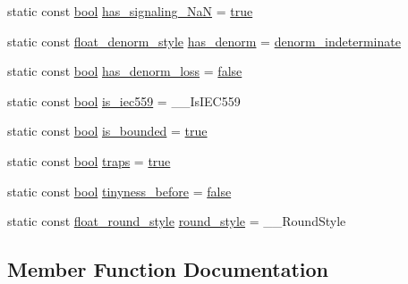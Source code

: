 \begin{DoxyCompactItemize}
static const \hyperlink{compiler_8h_abb452686968e48b67397da5f97445f5b}{bool} \hyperlink{class__Floating__limits_a10ed29d9cd801729180e3cd18d1612ca}{has\+\_\+signaling\+\_\+\+Na\+N} = \hyperlink{compiler_8h_a41f9c5fb8b08eb5dc3edce4dcb37fee7}{true}
\item 
static const \hyperlink{limits-hack_8h_a592fe78d9bf66455d12aa075f36313b6}{float\+\_\+denorm\+\_\+style} \hyperlink{class__Floating__limits_a634a0bceffb0c5392f002c42b9286281}{has\+\_\+denorm} = \hyperlink{limits-hack_8h_a592fe78d9bf66455d12aa075f36313b6ae6e5a92659b76e353da685746ec7a715}{denorm\+\_\+indeterminate}
\item 
static const \hyperlink{compiler_8h_abb452686968e48b67397da5f97445f5b}{bool} \hyperlink{class__Floating__limits_ad035ac78d3f3c86f752002d807f0aafe}{has\+\_\+denorm\+\_\+loss} = \hyperlink{compiler_8h_a65e9886d74aaee76545e83dd09011727}{false}
\item 
static const \hyperlink{compiler_8h_abb452686968e48b67397da5f97445f5b}{bool} \hyperlink{class__Floating__limits_aea8a035d0d9e19732abd0e2cf90ffcea}{is\+\_\+iec559} = \+\_\+\+\_\+\+Is\+I\+E\+C559
\item 
static const \hyperlink{compiler_8h_abb452686968e48b67397da5f97445f5b}{bool} \hyperlink{class__Floating__limits_ae1ea549d1fdb02edf5d8d2d5b0856991}{is\+\_\+bounded} = \hyperlink{compiler_8h_a41f9c5fb8b08eb5dc3edce4dcb37fee7}{true}
\item 
static const \hyperlink{compiler_8h_abb452686968e48b67397da5f97445f5b}{bool} \hyperlink{class__Floating__limits_a2423844e1d075b7016e7225033df04db}{traps} = \hyperlink{compiler_8h_a41f9c5fb8b08eb5dc3edce4dcb37fee7}{true}
\item 
static const \hyperlink{compiler_8h_abb452686968e48b67397da5f97445f5b}{bool} \hyperlink{class__Floating__limits_a92da64b8c5933b8aea8d342ce6896db8}{tinyness\+\_\+before} = \hyperlink{compiler_8h_a65e9886d74aaee76545e83dd09011727}{false}
\item 
static const \hyperlink{limits-hack_8h_a3bdaf6c7e8a65859bf550443989c5a66}{float\+\_\+round\+\_\+style} \hyperlink{class__Floating__limits_afdb0896f9db19d24fb73de6b3b52b515}{round\+\_\+style} = \+\_\+\+\_\+\+Round\+Style
\end{DoxyCompactItemize}


\subsection{Member Function Documentation}
\hypertarget{class__Floating__limits_a7c75774772f4a1b07c1d9eeaa7c3cf47}{}
